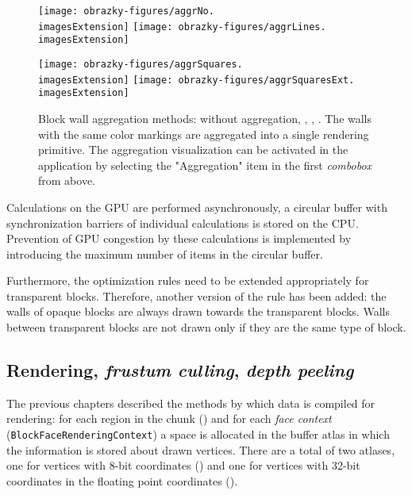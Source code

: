 \begin{figure}[H]
	\centering
	\texttt{[image: obrazky-figures/aggrNo.\\imagesExtension]}
	\hfill
	\texttt{[image: obrazky-figures/aggrLines.\\imagesExtension]}

	\vspace{2.5mm}

	\texttt{[image: obrazky-figures/aggrSquares.\\imagesExtension]}
	\hfill
	\texttt{[image: obrazky-figures/aggrSquaresExt.\\imagesExtension]}
	\caption{Block wall aggregation methods: without aggregation, , , . The walls with the same color markings are aggregated into a single rendering primitive. The aggregation visualization can be activated in the application by selecting the "Aggregation" item in the first \textit{combobox} from above.}
\end{figure}

Calculations on the GPU are performed asynchronously, a circular buffer with synchronization barriers of individual calculations is stored on the CPU. Prevention of GPU congestion by these calculations is implemented by introducing the maximum number of items in the circular buffer.

Furthermore, the optimization rules need to be extended appropriately for transparent blocks. Therefore, another version of the rule has been added: the walls of opaque blocks are always drawn towards the transparent blocks. Walls between transparent blocks are not drawn only if they are the same type of block.

\subsection{Rendering, \textit{frustum culling}, \textit{depth peeling}}
The previous chapters described the methods by which data is compiled for rendering: for each region in the chunk () and for each \textit{face context} (\texttt{BlockFace\-Rendering\-Context}) a space is allocated in the buffer atlas in which the information is stored about drawn vertices. There are a total of two atlases, one for vertices with 8-bit coordinates () and one for vertices with 32-bit coordinates in the floating point coordinates ().

